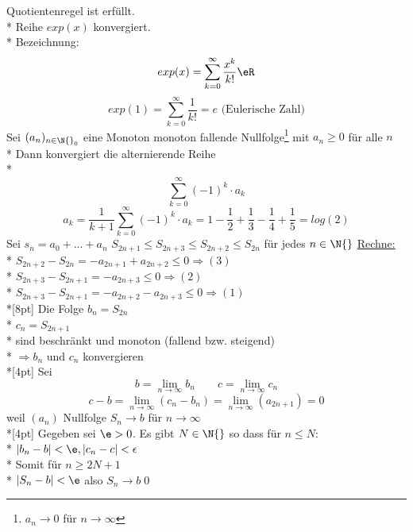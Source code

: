 \Rarr{} Quotientenregel ist erfüllt.\\*
Reihe $exp(x)$ konvergiert.\\*
Bezeichnung: $$exp(x) = \sum_{k=0}^{\infty} \frac{x^k}{k!} \eR$$
%
$$exp(1) = \sum\limits_{k=0}^{\infty} \frac{1}{k!} = e\text{ (Eulerische Zahl)}$$
Sei $(a_n)_{n \in \N{}_0}$ eine Monoton monoton fallende Nullfolge\footnote{$a_n → 0$ für $n→∞$} mit $a_n \geq 0$ für alle $n$\\*
Dann konvergiert die alternierende Reihe\\*
$$\sum_{k=0}^{\infty} (-1)^k · a_k$$
\bsp
$$a_k = \frac{1}{k + 1} \sum_{k=0}^{\infty} (-1)^k · a_k = 1 - \frac{1}{2} + \frac{1}{3} - \frac{1}{4} + \frac{1}{5}= log(2)$$
\bew
Sei $s_n = a_0 + ... + a_n$
$S_{2n + 1} \leq S_{2n + 3} \leq S_{2n + 2} \leq S_{2n}$ für jedes $n \in \N{}$
%
\ul{Rechne:}\\*
$S_{2n + 2} - S_{2n} = - a_{2n + 1} + a_{2n + 2} \leq 0 \Rightarrow (3)$\\*
$S_{2n + 3} - S_{2n + 1} = - a_{2n + 3} \leq 0 \Rightarrow (2)$\\*
$S_{2n + 3} - S_{2n + 1} = - a_{2n + 2} - a_{2n + 3} \leq 0 \Rightarrow (1)$\\*[8pt]
Die Folge $b_n = S_{2n}$\\*
\phantom{Die Folge }$c_n = S_{2n + 1}$\\*
sind beschränkt und monoton (fallend bzw. steigend)\\*
$\Rightarrow b_n \text{ und } c_n$ konvergieren\\*[4pt]
Sei $$b = \lim_{n \to \infty} b_n \qquad c = \lim_{n \to \infty} c_n$$
$$c - b = \lim_{n \to \infty} (c_n - b_n) = \lim_{n \to \infty} (a_{2n + 1}) = 0$$
weil $(a_n)$ Nullfolge
$S_n \to b$ für $n \to \infty$\\*[4pt]
Gegeben sei $\e > 0$. Es gibt $N \in \N{}$ so dass für $n \leq N$:\\*
$|b_n - b| < \e, |c_n - c| < \epsilon$\\*
Somit für $n \geq 2N+1 $\\*
$|S_n - b| < \e$ also $S_n \to b$\qed